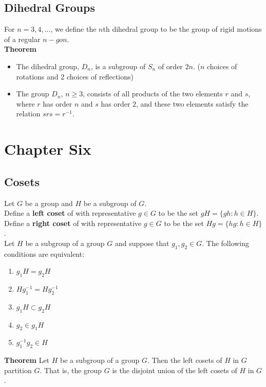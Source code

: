 \documentclass{article}
\begin{document}
\subsection{Dihedral Groups}
For $n=3,4,...$, we define the $n$th dihedral group to be the group of rigid motions of a regular $n-gon$. \\
\textbf{Theorem}
\begin{itemize}
    \item The dihedral group, $D_n$, is a subgroup of $S_n$ of order $2n$. ($n$ choices of rotations and 2 choices of reflections)
    \item The group $D_n$, $n\geq 3$, consists of all products of the two elements $r$ and $s$, where $r$ has order $n$ and $s$ has order $2$, and these two elements satisfy the relation $srs=r^{-1}$.
\end{itemize}

\section{Chapter Six}
\subsection{Cosets}
Let $G$ be a group and $H$ be a subgroup of $G$. \\
Define a \textbf{left coset} of with representative $g\in G$ to be the set $gH=\{gh: h\in H\}$.\\
Define a \textbf{right coset} of with representative $g\in G$ to be the set $Hg=\{hg: h\in H\}$.\\
Let $H$ be a subgroup of a group $G$ and suppose that $g_1,g_2\in G$. The following conditions are equivalent:
\begin{enumerate}
    \item $g_{1}H=g_{2}H$
    \item $Hg^{-1}_{1}=Hg^{-1}_{2}$
    \item $g_{1}H\subset g_{2}H$
    \item $g_{2}\in g_{1}H$
    \item $g_{1}^{-1}g_{2}\in H$
\end{enumerate}
\textbf{Theorem}
Let $H$ be a subgroup of a group $G$. Then the left cosets of $H$ in $G$ partition $G$. That is, the group $G$ is the disjoint union of the left cosets of $H$ in $G$.
\end{document}
